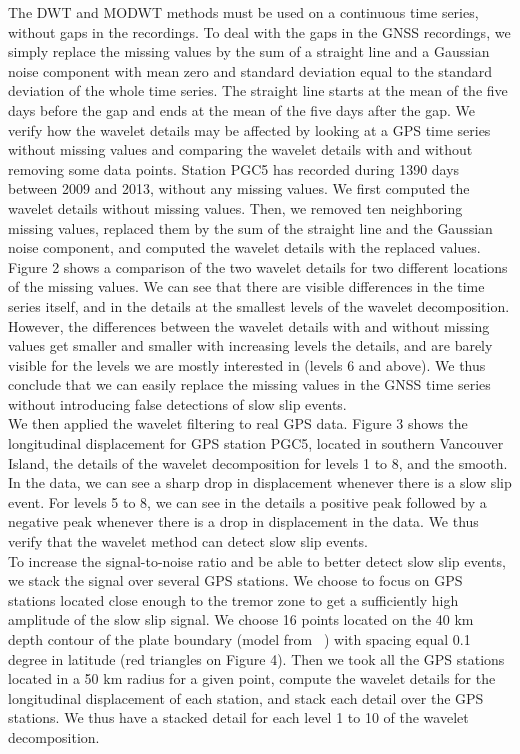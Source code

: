 \documentclass{article}
\begin{document}
The DWT and MODWT methods must be used on a continuous time series, without gaps in the recordings. To deal with the gaps in the GNSS recordings, we simply replace the missing values by the sum of a straight line and a Gaussian noise component with mean zero and standard deviation equal to the standard deviation of the whole time series. The straight line starts at the mean of the five days before the gap and ends at the mean of the five days after the gap. We verify how the wavelet details may be affected by looking at a GPS time series without missing values and comparing the wavelet details with and without removing some data points. Station PGC5 has recorded during 1390 days between 2009 and 2013, without any missing values. We first computed the wavelet details without missing values. Then, we removed ten neighboring missing values, replaced them by the sum of the straight line and the Gaussian noise component, and computed the wavelet details with the replaced values. Figure 2 shows a comparison of the two wavelet details for two different locations of the missing values. We can see that there are visible differences in the time series itself, and in the details at the smallest levels of the wavelet decomposition. However, the differences between the wavelet details with and without missing values get smaller and smaller with increasing levels the details, and are barely visible for the levels we are mostly interested in (levels 6 and above). We thus conclude that we can easily replace the missing values in the GNSS time series without introducing false detections of slow slip events. \\

We then applied the wavelet filtering to real GPS data. Figure 3 shows the longitudinal displacement for GPS station PGC5, located in southern Vancouver Island, the details of the wavelet decomposition for levels 1 to 8, and the smooth. In the data, we can see a sharp drop in displacement whenever there is a slow slip event. For levels 5 to 8, we can see in the details a positive peak followed by a negative peak whenever there is a drop in displacement in the data. We thus verify that the wavelet method can detect slow slip events. \\

To increase the signal-to-noise ratio and be able to better detect slow slip events, we stack the signal over several GPS stations. We choose to focus on GPS stations located close enough to the tremor zone to get a sufficiently high amplitude of the slow slip signal. We choose 16 points located on the 40 km depth contour of the plate boundary (model from ~\citet{PRE_2003}) with spacing equal 0.1 degree in latitude (red triangles on Figure 4). Then we took all the GPS stations located in a 50 km radius for a given point, compute the wavelet details for the longitudinal displacement of each station, and stack each detail over the GPS stations. We thus have a stacked detail for each level 1 to 10 of the wavelet decomposition. \\
\end{document}
